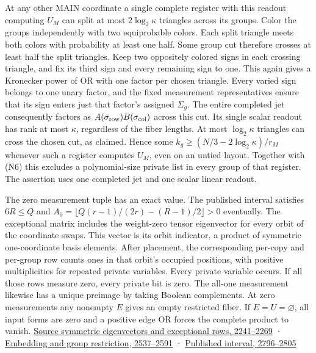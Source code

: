 \documentclass[11pt,a4paper]{article}
\begin{document}
At any other MAIN coordinate a single complete register with this
readout computing \(U_M\) can split at most \(2\log_2\kappa\) triangles
across its groups. Color the groups independently with two equiprobable
colors. Each split triangle meets both colors with probability at least
one half. Some group cut therefore crosses at least half the split
triangles. Keep two oppositely colored signs in each crossing triangle,
and fix its third sign and every remaining sign to one. This again gives
a Kronecker power of OR with one factor per chosen triangle. Every
varied sign belongs to one unary factor, and the fixed measurement
representatives ensure that its sign enters just that factor's assigned
\(\Sigma_g\). The entire completed jet consequently factors as
\(A(\sigma_{\rm row})B(\sigma_{\rm col})\) across this cut. Its single
scalar readout has rank at most \(\kappa\), regardless of the fiber
lengths. At most \(\log_2\kappa\) triangles can cross the chosen cut, as
claimed. Hence some \(k_g\ge (N/3-2\log_2\kappa)/r_M\) whenever such a
register computes \(U_M\), even on an untied layout. Together with (N6)
this excludes a polynomial-size private list in every group of that
register. The assertion uses one completed jet and one scalar linear
readout.

The zero measurement tuple has an exact value. The published interval
satisfies \(6R\le Q\) and \(A_0=\lfloor Q(r-1)/(2r)-(R-1)/2\rfloor>0\)
eventually. The exceptional matrix includes the weight-zero tensor
eigenvector for every orbit of the coordinate swaps. This vector is its
orbit indicator, a product of symmetric one-coordinate basis elements.
After placement, the corresponding per-copy and per-group row counts
ones in that orbit's occupied positions, with positive multiplicities
for repeated private variables. Every private variable occurs. If all
those rows measure zero, every private bit is zero. The all-one
measurement likewise has a unique preimage by taking Boolean
complements. At zero measurements any nonempty \(E\) gives an empty
restricted fiber. If \(E=U=\varnothing\), all input forms are zero and a
positive edge OR forces the complete product to vanish.
\href{https://github.com/openai/math/blob/main/preprints/The-Exponential-Time-Hypothesis-is-False-October-25-2026/build/main_full_version.tex\#L2241}{Source
symmetric eigenvectors and exceptional rows, 2241--2269} ·
\href{https://github.com/openai/math/blob/main/preprints/The-Exponential-Time-Hypothesis-is-False-October-25-2026/build/main_full_version.tex\#L2537}{Embedding
and group restriction, 2537--2591} ·
\href{https://github.com/openai/math/blob/main/preprints/The-Exponential-Time-Hypothesis-is-False-October-25-2026/build/main_full_version.tex\#L2796}{Published
interval, 2796--2805}
\end{document}

